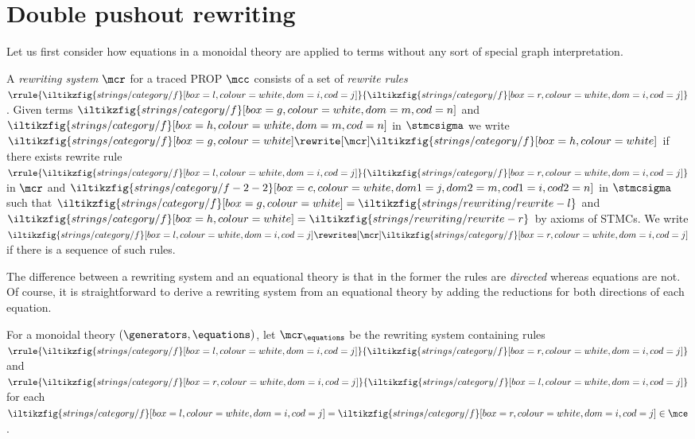 \section{Double pushout rewriting}

Let us first consider how equations in a monoidal theory are
applied to terms without any sort of special graph interpretation.

\begin{definition}\label{def:term-rewriting}
    A \emph{rewriting system} \(\mcr\) for a traced PROP \(\mcc\)
    consists of a set of \emph{rewrite rules} \(
    \rrule{
        \iltikzfig{strings/category/f}[box=l,colour=white,dom=i,cod=j]
    }{
        \iltikzfig{strings/category/f}[box=r,colour=white,dom=i,cod=j]
    }
    \).
    Given terms \(
    \iltikzfig{strings/category/f}[box=g,colour=white,dom=m,cod=n]
    \) and \(
    \iltikzfig{strings/category/f}[box=h,colour=white,dom=m,cod=n]
    \) in \(\stmcsigma\) we write \(
    \iltikzfig{strings/category/f}[box=g,colour=white]
    \rewrite[\mcr]
    \iltikzfig{strings/category/f}[box=h,colour=white]
    \) if there exists rewrite rule \(\rrule{
        \iltikzfig{strings/category/f}[box=l,colour=white,dom=i,cod=j]
    }{
        \iltikzfig{strings/category/f}[box=r,colour=white,dom=i,cod=j]
    }\) in \(\mcr\) and \(
    \iltikzfig{strings/category/f-2-2}[box=c,colour=white,dom1=j,dom2=m,cod1=i,cod2=n]
    \) in \(\stmcsigma\) such that \(
    \iltikzfig{strings/category/f}[box=g,colour=white]
    =
    \iltikzfig{strings/rewriting/rewrite-l}
    \) and \(
    \iltikzfig{strings/category/f}[box=h,colour=white]
    =
    \iltikzfig{strings/rewriting/rewrite-r}
    \) by axioms of STMCs.
    We write \(
    \iltikzfig{strings/category/f}[box=l,colour=white,dom=i,cod=j]
    \rewrites[\mcr]
    \iltikzfig{strings/category/f}[box=r,colour=white,dom=i,cod=j]
    \) if there is a sequence of such rules.
\end{definition}

The difference between a rewriting system and an equational theory is that in
the former the rules are \emph{directed} whereas equations are not.
Of course, it is straightforward to derive a rewriting system from an equational
theory by adding the reductions for both directions of each equation.

\begin{definition}
    For a monoidal theory \((\generators,\equations)\), let
    \(\mcr_{\equations}\) be the rewriting system containing rules
    \(\rrule{
        \iltikzfig{strings/category/f}[box=l,colour=white,dom=i,cod=j]
    }{
        \iltikzfig{strings/category/f}[box=r,colour=white,dom=i,cod=j]
    }\) and \(
    \rrule{
        \iltikzfig{strings/category/f}[box=r,colour=white,dom=i,cod=j]
    }{
        \iltikzfig{strings/category/f}[box=l,colour=white,dom=i,cod=j]
    }\) for each \(
    \iltikzfig{strings/category/f}[box=l,colour=white,dom=i,cod=j]
    =
    \iltikzfig{strings/category/f}[box=r,colour=white,dom=i,cod=j]
    \in
    \mce
    \).
\end{definition}

